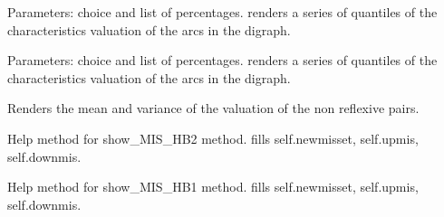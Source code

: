\documentclass[letterpaper,10pt,english]{sphinxmanual}
\begin{document}
\begin{fulllineitems}
\begin{fulllineitems}
\end{fulllineitems}


\begin{fulllineitems}
\label{techDoc:digraphs.Digraph.computeValuationPercentages}
Parameters: choice and list of percentages.
renders a series of quantiles of the characteristics valuation of
the arcs in the digraph.

\end{fulllineitems}


\begin{fulllineitems}
\label{techDoc:digraphs.Digraph.computeValuationPercentiles}
Parameters: choice and list of percentages.
renders a series of quantiles of the characteristics valuation of
the arcs in the digraph.

\end{fulllineitems}


\begin{fulllineitems}
\label{techDoc:digraphs.Digraph.computeValuationStatistics}
Renders the mean and variance of the valuation
of the non reflexive pairs.

\end{fulllineitems}


\begin{fulllineitems}
\label{techDoc:digraphs.Digraph.computeupdown1}
Help method for show\_MIS\_HB2 method.
fills self.newmisset, self.upmis, self.downmis.

\end{fulllineitems}


\begin{fulllineitems}
\label{techDoc:digraphs.Digraph.computeupdown2}
Help method for show\_MIS\_HB1 method.
fills self.newmisset, self.upmis, self.downmis.


\end{fulllineitems}
\end{fulllineitems}
\end{document}
